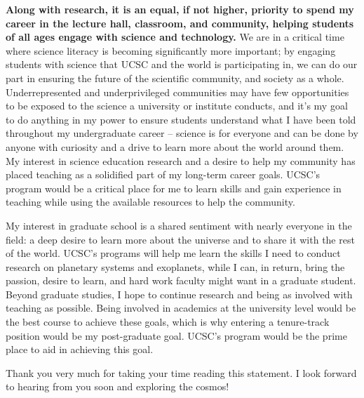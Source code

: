 \documentclass[11pt,letterpaper]{article}
\begin{document}
\textbf{Along with research, it is an equal, if not higher, priority to spend my career in the lecture hall, classroom, and community, helping students of all ages engage with science and technology.} We are in a critical time where science literacy is becoming significantly more important; by engaging students with science that UCSC and the world is participating in, we can do our part in ensuring the future of the scientific community, and society as a whole. Underrepresented and underprivileged communities may have few opportunities to be exposed to the science a university or institute conducts, and it’s my goal to do anything in my power to ensure students understand what I have been told throughout my undergraduate career -- science is for everyone and can be done by anyone with curiosity and a drive to learn more about the world around them. My interest in science education research and a desire to help my community has placed teaching as a solidified part of my long-term career goals. UCSC's program would be a critical place for me to learn skills and gain experience in teaching while using the available resources to help the community.

My interest in graduate school is a shared sentiment with nearly everyone in the field: a deep desire to learn more about the universe and to share it with the rest of the world. UCSC’s programs will help me learn the skills I need to conduct research on planetary systems and exoplanets, while I can, in return, bring the passion, desire to learn, and hard work faculty might want in a graduate student. Beyond graduate studies, I hope to continue research and being as involved with teaching as possible. Being involved in academics at the university level would be the best course to achieve these goals, which is why entering a tenure-track position would be my post-graduate goal. UCSC's program would be the prime place to aid in achieving this goal.

Thank you very much for taking your time reading this statement. I look forward to hearing from you soon and exploring the cosmos!
\end{document}

